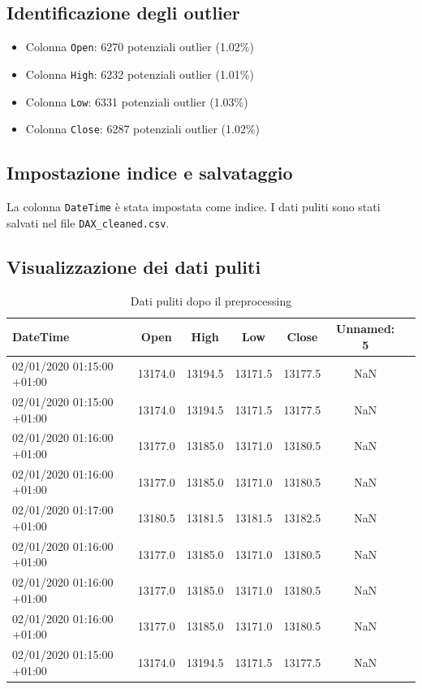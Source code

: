 \documentclass[%
	corpo=11pt,
    twoside,
    stile=classica,
    oldstyle,
    tipotesi=custom,
    greek,
    evenboxes,
]{toptesi}
\begin{document}
\subsection*{Identificazione degli outlier}

\begin{itemize}
	\item Colonna \texttt{Open}: 6270 potenziali outlier (1.02\%)
	\item Colonna \texttt{High}: 6232 potenziali outlier (1.01\%)
	\item Colonna \texttt{Low}: 6331 potenziali outlier (1.03\%)
	\item Colonna \texttt{Close}: 6287 potenziali outlier (1.02\%)
\end{itemize}

\subsection*{Impostazione indice e salvataggio}

La colonna \texttt{DateTime} è stata impostata come indice.  
I dati puliti sono stati salvati nel file \texttt{DAX\_cleaned.csv}.

\subsection*{Visualizzazione dei dati puliti}

\begin{table}[h]
	\centering
	\begin{tabular}{lcccccc}
		\hline
		DateTime & Open & High & Low & Close & Unnamed: 5 \\
		\hline
		02/01/2020 01:15:00 +01:00 & 13174.0 & 13194.5 & 13171.5 & 13177.5 & NaN \\
		02/01/2020 01:15:00 +01:00 & 13174.0 & 13194.5 & 13171.5 & 13177.5 & NaN \\
		02/01/2020 01:16:00 +01:00 & 13177.0 & 13185.0 & 13171.0 & 13180.5 & NaN \\
		02/01/2020 01:16:00 +01:00 & 13177.0 & 13185.0 & 13171.0 & 13180.5 & NaN \\
		02/01/2020 01:17:00 +01:00 & 13180.5 & 13181.5 & 13181.5 & 13182.5 & NaN \\
		02/01/2020 01:16:00 +01:00 & 13177.0 & 13185.0 & 13171.0 & 13180.5 & NaN \\
		02/01/2020 01:16:00 +01:00 & 13177.0 & 13185.0 & 13171.0 & 13180.5 & NaN \\
		02/01/2020 01:16:00 +01:00 & 13177.0 & 13185.0 & 13171.0 & 13180.5 & NaN \\
		02/01/2020 01:15:00 +01:00 & 13174.0 & 13194.5 & 13171.5 & 13177.5 & NaN \\
		\hline
	\end{tabular}
	\caption{Dati puliti dopo il preprocessing}
\end{table}
\end{document}
